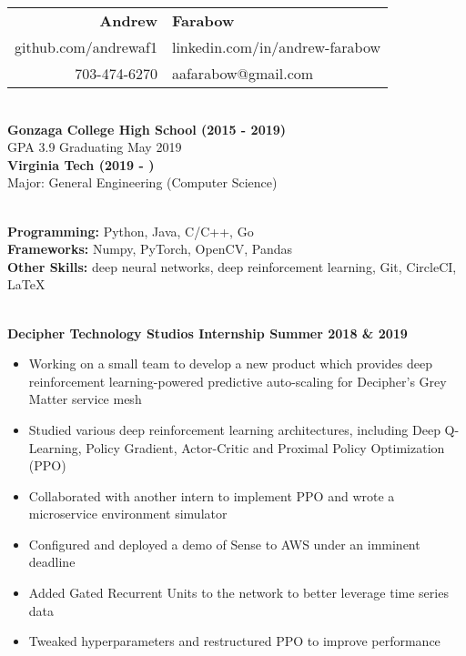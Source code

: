 \documentclass{article}
\begin{document}
  \begin{center}
    \begin{tabular}{r l}
      {\huge\textbf{Andrew}} & {\huge\textbf{Farabow}} \\
      \hspace{35pt} github.com/andrewaf1 & linkedin.com/in/andrew-farabow \\
      703-474-6270 & aafarabow@gmail.com \\
    \end{tabular}


  \begin{flushleft}
    \begin{multicols}{2}
      {\large\textbf{\underline{}}} \\
      \textbf{Gonzaga College High School	(2015 - 2019)} \\
      GPA 3.9  Graduating May 2019 \\
      \textbf{Virginia Tech	(2019 - )} \\
      Major: General Engineering (Computer Science)

    \columnbreak
    {\large\textbf{\underline{}}} \\
    {\textbf{Programming:}} Python, Java, C/C++, Go \\
    {\textbf{Frameworks:}} Numpy, PyTorch, OpenCV, Pandas \\
    {\textbf{Other Skills:}} deep neural networks, deep reinforcement learning, Git, CircleCI, LaTeX \\

    \end{multicols}

    {\large\textbf{\underline{}}} \\
    \textbf{Decipher Technology Studios Internship \hfill Summer 2018 \& 2019}
    \begin{itemize}
      \item Working on a small team to develop a new product which provides deep reinforcement learning-powered predictive auto-scaling for Decipher's Grey Matter service mesh
      \item Studied various deep reinforcement learning architectures, including Deep Q-Learning, Policy Gradient, Actor-Critic and Proximal Policy Optimization (PPO)
      \item Collaborated with another intern to implement PPO and wrote a microservice environment simulator
      \item Configured and deployed a demo of Sense to AWS under an imminent deadline
      \item Added Gated Recurrent Units to the network to better leverage time series data
      \item Tweaked hyperparameters and restructured PPO to improve performance
    \end{itemize}



\end{flushleft}
\end{center}
\end{document}

